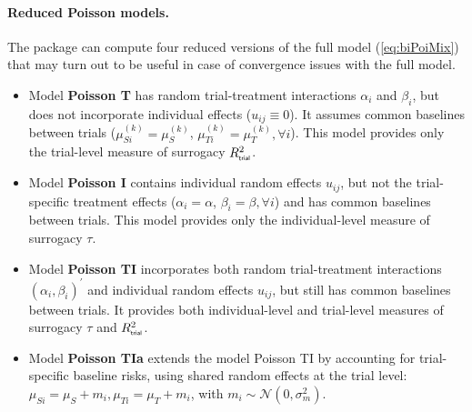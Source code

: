 \documentclass[]{scrartcl}\usepackage[]{graphicx}\usepackage[]{color}
\begin{document}
{{%
\paragraph{Reduced Poisson models.}
The  package can compute four reduced versions 
  of the full model (\ref{eq:biPoiMix})
  that may turn out to be useful in case of convergence issues with the full model.
\begin{itemize}
\item Model \textbf{Poisson T} has
  random trial-treatment interactions $\alpha_i$ and $\beta_i$,
  but does not incorporate individual effects ($u_{ij} \equiv 0$).
It assumes common baselines between trials
($\mu^{(k)}_{Si} = \mu^{(k)}_{S}$, $\mu^{(k)}_{Ti} = \mu^{(k)}_{T},
\forall i$).
This model provides only the trial-level measure of surrogacy
$R^2_{\textsf{\tiny trial}}$.

\item Model \textbf{Poisson I} contains individual random effects $u_{ij}$,
but not the trial-specific treatment effects 
($\alpha_i = \alpha$, $\beta_i = \beta, \forall i$)
and has common baselines between trials.
This model provides only the individual-level measure of surrogacy
$\tau$.

\item Model \textbf{Poisson TI} incorporates
both random trial-treatment interactions
$(\alpha_i, \beta_i)^\prime$
and individual random effects $u_{ij}$,
but still has common baselines between trials.
It provides both individual-level and trial-level measures of surrogacy
$\tau$ and $R^2_{\textsf{\tiny trial}}$.

\item Model \textbf{Poisson TIa} extends the model Poisson TI
by accounting for trial-specific baseline risks,
using shared random effects at the trial level:
$\mu_{Si} = \mu_S + m_i, \mu_{Ti} = \mu_T + m_i$,
with $m_i\sim\mathcal N(0, \sigma^2_m)$.
\end{itemize}



}}
\end{document}
